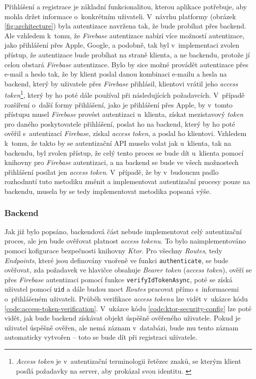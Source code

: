 Přihlášení a registrace je základní funkcionalitou, kterou aplikace potřebuje, aby mohla držet informace o~konkrétním uživateli. V~návrhu platformy (obrázek \ref{fig:architecture}) byla autentizace navržena tak, že bude probíhat přes backend. Ale vzhledem k~tomu, že \emph{Firebase} autentizace nabízí více možností autentizace, jako přihlášení přes Apple, Google, a podobně, tak byl v~implementaci zvolen přístup, že autentizace bude probíhat na straně klienta, a ne backendu, protože jí celou obstará \emph{Firebase} autentizace. Bylo by sice možné provádět autentizace přes e-mail a heslo tak, že by klient poslal danou kombinaci e-mailu a hesla na backend, který by uživatele přes \emph{Firebase} přihlásil, klientovi vrátil jeho \emph{access token}\footnote{\emph{Access token} je v~autentizační terminologii řetězec znaků, se kterým klient posílá požadavky na server, aby prokázal svou identitu. \cite{access-token}}, který by ho poté dále používal při následujících požadavcích. V~případě rozšíření o~další formy přihlášení, jako je přihlášení přes Apple, by v~tomto přístupu musel \emph{Firebase} provést autentizaci u~klienta, získat mezistavový \emph{token} pro daného poskytovatele přihlášení, poslat ho na backend, který by ho poté ověřil s~autentizací \emph{Firebase}, získal \emph{access token}, a poslal ho klientovi. Vzhledem k~tomu, že takto by se autentizační API muselo volat jak u~klienta, tak na backendu, byl zvolen přístup, že celý tento proces se bude dít u~klienta pomocí knihovny pro \emph{Firebase} autentizaci, a na backend se bude ve všech možnostech přihlášení posílat jen \emph{access token}. V~případě, že by v~budoucnu padlo rozhodnutí tuto metodiku změnit a implementovat autentizační procesy pouze na backendu, musela by se tedy implementovat metodika popsaná výše.

\subsubsection{Backend}

Jak již bylo popsáno, backendová část nebude implementovat celý autentizační proces, ale jen bude ověřovat platnost \emph{access tokenu}. To bylo naimplementováno pomocí kofigurace bezpečnosti knihovny \emph{Ktor}. Pro všechny \emph{Routes}, tedy \emph{Endpoints}, které jsou definovány vnořeně ve funkci \texttt{authenticate}, se bude ověřovat, zda požadavek ve hlavičce obsahuje \emph{Bearer token} (\emph{access token}), ověří se přes \emph{Firebase} autentizaci pomocí funkce \texttt{verifyIdTokenAsync}, poté se získá uživatel pomocí \texttt{uid} a dále budou moct \emph{Routes} pracovat přímo s~informacemi o~přihlášeném uživateli. Průběh verifikace \emph{access tokenu} lze vidět v~ukázce kódu \ref{code:access-token-verification}. V~ukázce kódu \ref{code:ktor-security-config} lze poté vidět, jak bude backend získávat objekt úspěšně ověřeného uživatele. Pokud je uživatel úspěšně ověřen, ale nemá záznam v~databázi, bude mu tento záznam automaticky vytvořen – toto se bude dít při registraci uživatele.

